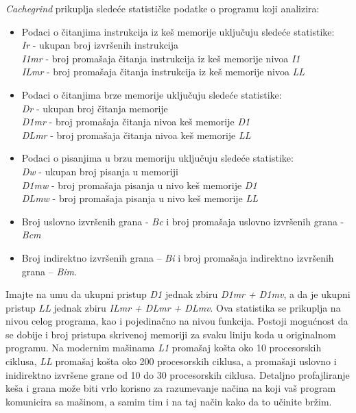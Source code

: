\documentclass[12pt,oneside]{memoir}
\theoremstyle{plain}
\theoremstyle{definition}
\begin{document}
\textit{Cachegrind} prikuplja sledeće statističke podatke o programu koji analizira:
\begin{itemize}
	\item Podaci o čitanjima instrukcija iz keš memorije uključuju sledeće statistike:\\
	\textit{Ir} - ukupan broj izvršenih instrukcija \\
	\textit{I1mr} - broj promašaja čitanja instrukcija iz keš memorije nivoa \textit{I1} \\
	\textit{ILmr} - broj promašaja čitanja instrukcija iz keš memorije nivoa \textit{LL}
	\item Podaci o čitanjima brze memorije uključuju sledeće statistike: \\
	\textit{Dr} - ukupan broj čitanja memorije \\
	\textit{D1mr} - broj promašaja čitanja nivoa keš memorije \textit{D1} \\ 
	\textit{DLmr} - broj promašaja čitanja nivoa keš memorije \textit{LL}
	\item Podaci o pisanjima u brzu memoriju uključuju sledeće statistike: \\
	\textit{Dw} - ukupan broj pisanja u memoriji \\
	\textit{D1mw} - broj promašaja pisanja u nivo keš memorije \textit{D1} \\
	\textit{DLmw} - broj promašaja pisanja u nivo keš memorije \textit{LL}
	\item Broj uslovno izvršenih grana - \textit{Bc} i broj promašaja uslovno izvršenih grana - \textit{Bcm}
	\item Broj indirektno izvršenih grana – \textit{Bi}  i broj promašaja indirektno izvršenih grana – \textit{Bim}.
\end{itemize}

Imajte na umu da ukupni pristup \textit{D1} jednak zbiru \textit{D1mr + D1mv}, a da je ukupni pristup \textit{LL} jednak zbiru \textit{ILmr + DLmr + DLmv}. Ova statistika se prikuplja na nivou celog programa, kao i pojedinačno na nivou funkcija. Postoji mogućnost da se dobije i broj pristupa skrivenoj memoriji za svaku liniju koda u originalnom programu. Na modernim mašinama \textit{L1} promašaj košta oko 10 procesorskih ciklusa, \textit{LL} promašaj košta oko 200 procesorskih ciklusa, a promašaji uslovno i inidirektno izvršene grane od 10 do 30 procesorskih ciklusa. Detaljno profajliranje keša i grana može biti vrlo korisno za razumevanje načina na koji vaš program komunicira sa mašinom, a samim tim i na taj način kako da to učinite bržim.
\end{document}
